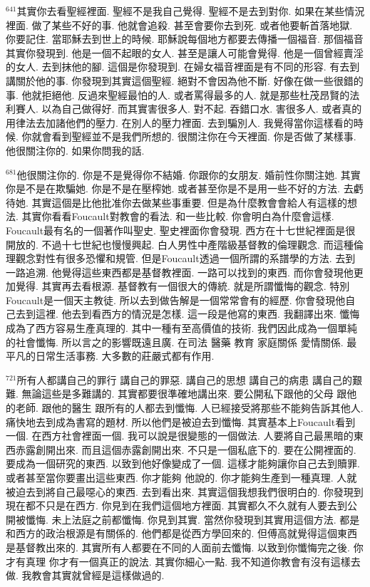 \documentclass{book}
\begin{document}
$^{641}$其實你去看聖經裡面.
聖經不是我自己覺得.
聖經不是去到對你.
如果在某些情況裡面.
做了某些不好的事.
他就會追殺.
甚至會要你去到死.
或者他要斬首落地獄.
你要記住.
當耶穌去到世上的時候.
耶穌說每個地方都要去傳播一個福音.
那個福音其實你發現到.
他是一個不起眼的女人.
甚至是讓人可能會覺得.
他是一個曾經賣淫的女人.
去到抹他的腳.
這個是你發現到.
在婦女福音裡面是有不同的形容.
有去到講關於他的事.
你發現到其實這個聖經.
絕對不會因為他不斷.
好像在做一些很錯的事.
他就拒絕他.
反過來聖經最怕的人.
或者罵得最多的人.
就是那些杜茂昂賢的法利賽人.
以為自己做得好.
而其實害很多人.
對不起.
吞錯口水.
害很多人.
或者真的用律法去加諸他們的壓力.
在別人的壓力裡面.
去到騙別人.
我覺得當你這樣看的時候.
你就會看到聖經並不是我們所想的.
很關注你在今天裡面.
你是否做了某樣事.
他很關注你的.
如果你問我的話.

$^{681}$他很關注你的.
你是不是覺得你不結婚.
你跟你的女朋友.
婚前性你關注她.
其實你是不是在欺騙她.
你是不是在壓榨她.
或者甚至你是不是用一些不好的方法.
去虧待她.
其實這個是比他批准你去做某些事重要.
但是為什麼教會會給人有這樣的想法.
其實你看看Foucault對教會的看法.
和一些比較.
你會明白為什麼會這樣.
Foucault最有名的一個著作叫聖史.
聖史裡面你會發現.
西方在十七世紀裡面是很開放的.
不過十七世紀也慢慢興起.
白人男性中產階級基督教的倫理觀念.
而這種倫理觀念對性有很多恐懼和規管.
但是Foucault透過一個所謂的系譜學的方法.
去到一路追溯.
他覺得這些東西都是基督教裡面.
一路可以找到的東西.
而你會發現他更加覺得.
其實再去看根源.
基督教有一個很大的傳統.
就是所謂懺悔的觀念.
特別Foucault是一個天主教徒.
所以去到做告解是一個常常會有的經歷.
你會發現他自己去到這裡.
他去到看西方的情況是怎樣.
這一段是他寫的東西.
我翻譯出來.
懺悔成為了西方容易生產真理的.
其中一種有至高價值的技術.
我們因此成為一個單純的社會懺悔.
所以言之的影響既遠且廣.
在司法 醫藥 教育 家庭關係 愛情關係.
最平凡的日常生活事務.
大多數的莊嚴式都有作用.

$^{721}$所有人都講自己的罪行 講自己的罪惡.
講自己的思想 講自己的病患 講自己的艱難.
無論這些是多難講的.
其實都要很準確地講出來.
要公開私下跟他的父母 跟他的老師.
跟他的醫生 跟所有的人都去到懺悔.
人已經接受將那些不能夠告訴其他人.
痛快地去到成為書寫的題材.
所以他們是被迫去到懺悔.
其實基本上Foucault看到一個.
在西方社會裡面一個.
我可以說是很變態的一個做法.
人要將自己最黑暗的東西赤露創開出來.
而且這個赤露創開出來.
不只是一個私底下的.
要在公開裡面的.
要成為一個研究的東西.
以致到他好像變成了一個.
這樣才能夠讓你自己去到贖罪.
或者甚至當你要畫出這些東西.
你才能夠 他說的.
你才能夠生產到一種真理.
人就被迫去到將自己最噁心的東西.
去到看出來.
其實這個我想我們很明白的.
你發現到現在都不只是在西方.
你見到在我們這個地方裡面.
其實都久不久就有人要去到公開被懺悔.
未上法庭之前都懺悔.
你見到其實.
當然你發現到其實用這個方法.
都是和西方的政治根源是有關係的.
他們都是從西方學回來的.
但傅高就覺得這個東西是基督教出來的.
其實所有人都要在不同的人面前去懺悔.
以致到你懺悔完之後.
你才有真理 你才有一個真正的說法.
其實你細心一點.
我不知道你教會有沒有這樣去做.
我教會其實就曾經是這樣做過的.
\end{document}
